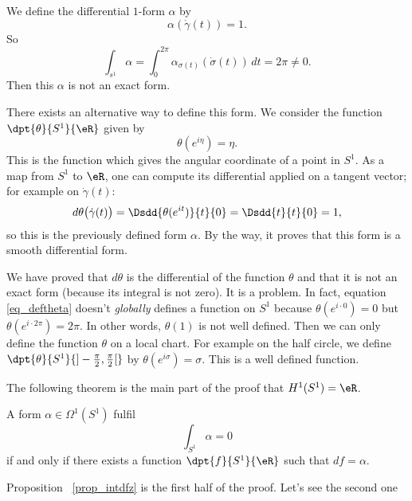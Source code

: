 We define the differential $1$-form $\alpha$ by
\[
  \alpha(\dot\gamma(t))=1.
\]
So
\[
  \int_{s^1}\alpha=\int_0^{2\pi}\alpha_{\sigma(t)}(\dot \sigma(t))\,dt=2\pi\neq0.
\]
Then this $\alpha$ is not an exact form.

There exists an alternative way to define this form. We consider the function $\dpt{ \theta }{ S^1 }{ \eR }$ given by
\begin{equation} \label{eq_deftheta}
\theta(e^{i\eta})=\eta.
\end{equation}
 This is the function which gives the angular coordinate of a point in $S^1$. As a map from $S^1$ to $\eR$, one can compute its differential applied on a tangent vector; for example on $\dot\gamma(t)$:
\[
  d\theta\big( \dot\gamma(t) \big)=\Dsdd{ \theta(e^{it}) }{t}{0}=\Dsdd{ t }{t}{0}=1,
\]
so this is the previously defined form $\alpha$. By the way, it proves that this form is a smooth differential form.

We have proved that $d\theta$ is the differential of the function $\theta$ and that it is not an exact form (because its integral is not zero). It is a problem. In fact, equation \eqref{eq_deftheta} doesn't \emph{globally} defines a function on $S^1$ because $\theta(e^{i\cdot 0})=0$ but $\theta(e^{i\cdot 2\pi})=2\pi$. In other words, $\theta(1)$ is not well defined. Then we can only define the function $\theta$ on a local chart. For example on the half circle, we define $\dpt{ \theta }{ S^1 }{ ]-\frac{ \pi }{ 2 },\frac{ \pi }{2}[ }$ by $\theta(e^{i\sigma})=\sigma$. This is a well defined function.

The following theorem is the main part of the proof that $H^1(S^1)=\eR$.

\begin{theorem}
   A form $\alpha\in\Omega^1(S^1)$ fulfil
\[
  \int_{S^1}\alpha=0
\]
if and only if there exists a function $\dpt{ f }{ S^1 }{ \eR }$ such that $df=\alpha$.
\end{theorem}
Proposition ~\ref{prop_intdfz} is the first half of the proof. Let's see the second one

